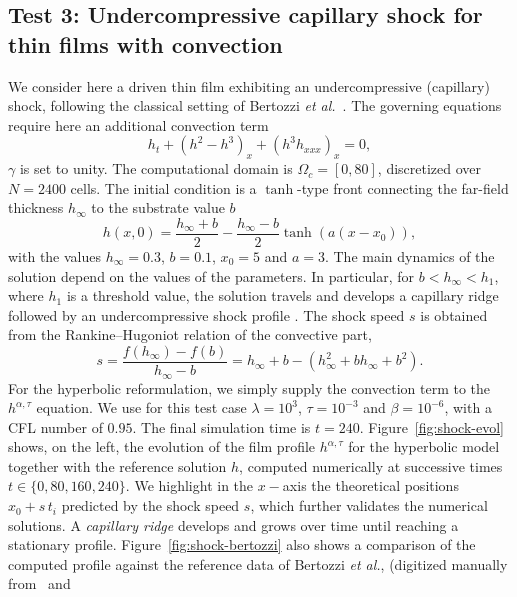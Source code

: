 \documentclass[11pt]{article}
\numberwithin{equation}{section}
\newtheorem{counter example}[theorem]{Counter Example}
\numberwithin{equation}{section}
\numberwithin{equation}{section}
\newcommand{\prn}[1]{\left( #1 \right)}
\begin{document}
\subsection{Test 3: Undercompressive capillary shock for thin films with convection}\label{ssec:shock}
We consider here a driven thin film exhibiting an
undercompressive (capillary) shock, following the classical setting of
Bertozzi \emph{et al.}~\cite{bertozzi1999undercompressive}. The governing equations require here an additional convection term 
\begin{equation*}
	h_t + \prn{h^2 - h^3}_x + \prn{h^3 h_{xxx}}_x = 0,
\end{equation*}
$\gamma$ is set to unity. The computational domain is $\Omega_c=[0,80]$, discretized over $N=2400$ cells.
The initial condition is a $\tanh$-type front connecting the far-field thickness
$h_\infty$ to the substrate value $b$
\begin{equation}
	h(x,0) = \frac{h_\infty + b}{2} - \frac{h_\infty - b}{2}
	\tanh\prn{a\prn{x - x_0}},
    	\label{eq:IC_tanh}
\end{equation}
with the values $h_\infty=0.3$, $b=0.1$, $x_0=5$ and $a=3$. The main dynamics of the solution depend on the values of the parameters. In particular, for $b<h_\infty<h_1$, where $h_1$ is a threshold value, the solution travels and develops a capillary ridge followed by an undercompressive shock profile \cite{bertozzi1999undercompressive}. The shock speed $s$ is obtained from the
Rankine--Hugoniot relation of the convective part,
\begin{equation*}
	s = \frac{f(h_\infty) - f(b)}{h_\infty - b}
	= h_\infty  + b - (h_\infty^2+b h_\infty + b^2).
\end{equation*}
For the hyperbolic reformulation, we simply supply the convection term to the $h^{\alpha,\tau}$ equation. We use for this test case $\lambda=10^{3}$, $\tau=10^{-3}$ and
$\beta=10^{-6}$, with a CFL number of $0.95$. The final simulation time is $t=240$. Figure~\ref{fig:shock-evol} shows, on the left, the evolution of the film
profile $h^{\alpha,\tau}$ for the hyperbolic model together with the reference solution $h$, computed numerically at successive times $t\in\{0,80,160,240\}$. We highlight in the $x-$axis the theoretical positions $x_0 + s\,t_i$ predicted by the shock speed $s$, which further validates the numerical solutions. A \textit{capillary ridge} develops and grows over time until reaching a stationary profile. 
Figure~\ref{fig:shock-bertozzi} also shows a comparison of the computed profile against the reference data of Bertozzi \emph{et al.},  (digitized manually from~\cite{bertozzi1999undercompressive} and
\end{document}
